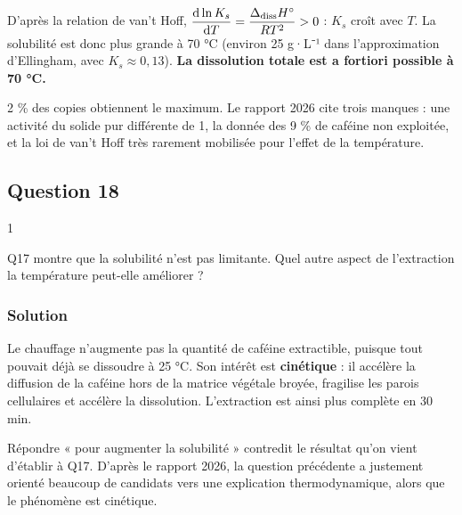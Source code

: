\documentclass[11pt,a4paper]{article}
\begin{document}
D'après la relation de van't Hoff, \(\dfrac{\mathrm d\ln K_s}{\mathrm dT} = \dfrac{\Delta_{\rm diss}H^\circ}{RT^2} > 0\) : \(K_s\) croît avec \(T\). La solubilité est donc plus grande à 70 °C (environ 25 g·L⁻¹ dans l'approximation d'Ellingham, avec \(K_s \approx 0{,}13\)). \textbf{La dissolution totale est a fortiori possible à 70 °C.}

\begin{jury}

2 \% des copies obtiennent le maximum. Le rapport 2026 cite trois manques : une activité du solide pur différente de 1, la donnée des 9 \% de caféine non exploitée, et la loi de van't Hoff très rarement mobilisée pour l'effet de la température.

\end{jury}

\hypertarget{question-18}{%
\subsection{Question 18}\label{question-18}}

\begin{indication}{1}

Q17 montre que la solubilité n'est pas limitante. Quel autre aspect de l'extraction la température peut-elle améliorer ?

\end{indication}

\hypertarget{solution-17}{%
\subsubsection{Solution}\label{solution-17}}

Le chauffage n'augmente pas la quantité de caféine extractible, puisque tout pouvait déjà se dissoudre à 25 °C. Son intérêt est \textbf{cinétique} : il accélère la diffusion de la caféine hors de la matrice végétale broyée, fragilise les parois cellulaires et accélère la dissolution. L'extraction est ainsi plus complète en 30 min.

\begin{piege}

Répondre « pour augmenter la solubilité » contredit le résultat qu'on vient d'établir à Q17. D'après le rapport 2026, la question précédente a justement orienté beaucoup de candidats vers une explication thermodynamique, alors que le phénomène est cinétique.

\end{piege}
\end{document}
